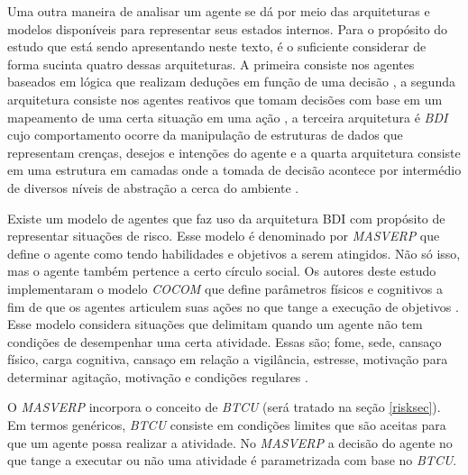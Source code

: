 Uma outra maneira de analisar um agente se dá por meio das arquiteturas e modelos disponíveis para representar seus estados internos. Para o propósito do estudo que está sendo apresentando neste texto, é o suficiente considerar de forma sucinta quatro dessas arquiteturas. A primeira consiste nos agentes baseados em lógica que realizam deduções em função de uma decisão \cite{logicagent}, a segunda arquitetura consiste nos agentes reativos que tomam decisões com base em um mapeamento de uma certa situação em uma  ação \cite{reactiveagent}, a terceira arquitetura é \textit{BDI} cujo comportamento ocorre da manipulação de estruturas de dados que representam crenças, desejos e intenções do agente \cite{bdi} e a quarta arquitetura consiste em uma estrutura em camadas onde a tomada de decisão acontece por intermédio de diversos níveis de abstração a cerca do ambiente \cite{layeragent} \cite{whatisagent}.  

Existe um modelo de agentes que faz uso da arquitetura BDI com propósito de representar situações de risco. Esse modelo é denominado por \textit{MASVERP} que define o agente como tendo habilidades e objetivos a serem atingidos. Não só isso, mas o agente também pertence a certo círculo social. Os autores deste estudo implementaram o modelo \textit{COCOM} que define parâmetros físicos e cognitivos a fim de que os agentes articulem suas ações no que tange a execução de objetivos \cite{mavesp}. Esse modelo considera situações que delimitam quando um agente não tem condições de desempenhar uma certa atividade. Essas são; fome, sede, cansaço físico, carga cognitiva, cansaço em relação a vigilância, estresse, motivação para determinar agitação, motivação e condições regulares \cite{mavesp}. 

O \textit{MASVERP} incorpora o conceito de \textit{BTCU} (será tratado na seção \ref{risksec}). Em termos genéricos, \textit{BTCU} consiste em condições limites que são aceitas para que um agente possa realizar a atividade. No \textit{MASVERP} a decisão do agente no que tange a executar ou não uma atividade é parametrizada com base no \textit{BTCU}. 